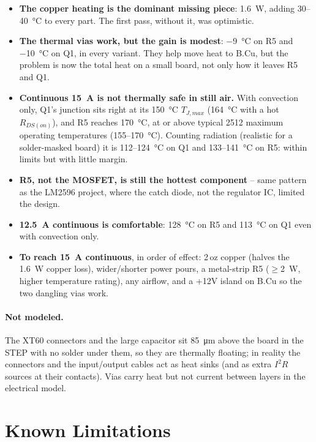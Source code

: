 \documentclass[11pt,letterpaper]{article}
\begin{document}
\begin{itemize}
\item \textbf{The copper heating is the dominant missing piece}: \SI{1.6}{\watt}, adding
\SI{30}{}--\SI{40}{\celsius} to every part. The first pass, without it, was optimistic.
\item \textbf{The thermal vias work, but the gain is modest}: \SI{-9}{\celsius} on R5 and
\SI{-10}{\celsius} on Q1, in every variant. They help move heat to B.Cu, but the problem is now the total
heat on a small board, not only how it leaves R5 and Q1.
\item \textbf{Continuous \SI{15}{\ampere} is not thermally safe in still air.} With convection only, Q1's
junction sits right at its \SI{150}{\celsius} $T_{J,max}$ (\SI{164}{\celsius} with a hot $R_{DS(on)}$),
and R5 reaches \SI{170}{\celsius}, at or above typical 2512 maximum operating temperatures
(\SI{155}{}--\SI{170}{\celsius}). Counting radiation (realistic for a solder-masked board) it is
\SI{112}{}--\SI{124}{\celsius} on Q1 and \SI{133}{}--\SI{141}{\celsius} on R5: within limits but with
little margin.
\item \textbf{R5, not the MOSFET, is still the hottest component} -- same pattern as the LM2596 project,
where the catch diode, not the regulator IC, limited the design.
\item \textbf{\SI{12.5}{\ampere} continuous is comfortable}: \SI{128}{\celsius} on R5 and \SI{113}{\celsius}
on Q1 even with convection only.
\item \textbf{To reach \SI{15}{\ampere} continuous}, in order of effect: 2\,oz copper (halves the
\SI{1.6}{\watt} copper loss), wider/shorter power pours, a metal-strip R5 ($\geq$\SI{2}{\watt},
higher temperature rating), any airflow, and a +12V island on B.Cu so the two dangling vias work.
\end{itemize}

\paragraph{Not modeled.} The XT60 connectors and the large capacitor sit \SI{85}{\micro\meter} above the
board in the STEP with no solder under them, so they are thermally floating; in reality the connectors and
the input/output cables act as heat sinks (and as extra $I^2R$ sources at their contacts). Vias carry heat
but not current between layers in the electrical model.

\section{Known Limitations}
\end{document}
